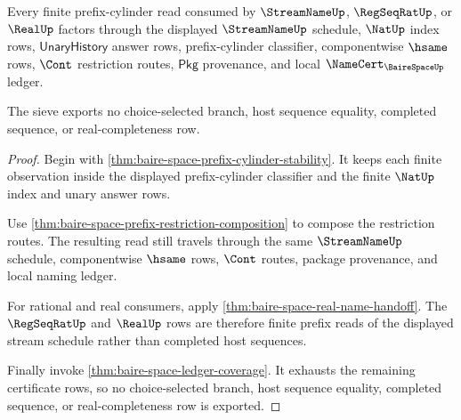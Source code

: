 \begin{theorem}
\label{thm:bairespace-streamname-prefix-sieve}
Every finite prefix-cylinder read consumed by $\StreamNameUp$, $\RegSeqRatUp$,
or $\RealUp$ factors through the displayed $\StreamNameUp$ schedule, $\NatUp$
index rows, $\mathsf{UnaryHistory}$ answer rows, prefix-cylinder classifier,
componentwise $\hsame$ rows, $\Cont$ restriction routes, $\mathsf{Pkg}$
provenance, and local $\NameCert_{\BaireSpaceUp}$ ledger.

The sieve exports no choice-selected branch, host sequence equality, completed
sequence, or real-completeness row.
\end{theorem}
\begin{proof}
Begin with \autoref{thm:baire-space-prefix-cylinder-stability}. It keeps each
finite observation inside the displayed prefix-cylinder classifier and the
finite $\NatUp$ index and unary answer rows.

Use \autoref{thm:baire-space-prefix-restriction-composition} to compose the
restriction routes. The resulting read still travels through the same
$\StreamNameUp$ schedule, componentwise $\hsame$ rows, $\Cont$ routes, package
provenance, and local naming ledger.

For rational and real consumers, apply
\autoref{thm:baire-space-real-name-handoff}. The $\RegSeqRatUp$ and $\RealUp$
rows are therefore finite prefix reads of the displayed stream schedule rather
than completed host sequences.

Finally invoke \autoref{thm:baire-space-ledger-coverage}. It exhausts the
remaining certificate rows, so no choice-selected branch, host sequence
equality, completed sequence, or real-completeness row is exported.
\end{proof}

